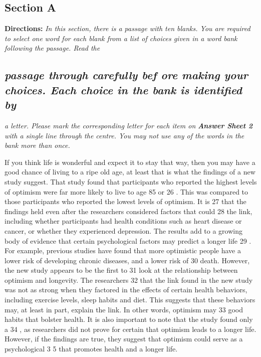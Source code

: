\documentclass[UTF8,11pt]{ctexart}
\begin{document}
\subsection*{\textbf{Section A}}


\textbf{Directions: }\textit{In this section, there is a passage with ten blanks. You are required to select one} \textit{word for each blank from a list of choices given in a word bank following the passage. Read the}


\subsection*{\textit{passage through carefully bef ore making your choices. Each choice in the bank is identified by}}


\textit{a letter. Please mark the corresponding letter for each item on }\textbf{\textit{Answer Sheet 2 }}\textit{with a single} \textit{line through the centre. You may not use any of the words in the bank more than once.}


If you think life is wonderful and expect it to stay that way, then you may have a good chance of living to a ripe old age, at least that is what the findings of a new study suggest. That study found that participants who reported the highest levels of optimism were far more likely to live to age 85 or 26 . This was compared to those participants who reported the lowest levels of optimism. It is 27 that the findings held even after the researchers considered factors that could 28 the link, including whether participants had health conditions such as heart disease or cancer, or whether they experienced depression. The results add to a growing body of evidence that certain psychological factors may predict a longer life 29 . For example, previous studies have found that more optimistic people have a lower risk of developing chronic diseases, and a lower risk of 30 death. However, the new study appears to be the first to 31 look at the relationship between optimism and longevity. The researchers 32 that the link found in the new study was not as strong when they factored in the effects of certain health behaviors, including exercise levels, sleep habits and diet. This suggests that these behaviors may, at least in part, explain the link. In other words, optimism may 33 good habits that bolster health. It is also important to note that the study found only a 34 , as researchers did not prove for certain that optimism leads to a longer life. However, if the findings are true, they suggest that optimism could serve as a psychological 3 5 that promotes health and a longer life.
\end{document}
